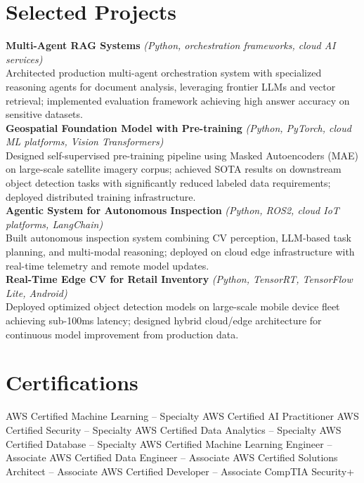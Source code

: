 \documentclass[11pt]{article}
\begin{document}
\section*{Selected Projects}
\textbf{Multi-Agent RAG Systems} \emph{(Python, orchestration frameworks, cloud AI services)}\\
Architected production multi-agent orchestration system with specialized reasoning agents for document analysis, leveraging frontier LLMs and vector retrieval; implemented evaluation framework achieving high answer accuracy on sensitive datasets.
\\[0.25em]
\textbf{Geospatial Foundation Model with Pre-training} \emph{(Python, PyTorch, cloud ML platforms, Vision Transformers)}\\
Designed self-supervised pre-training pipeline using Masked Autoencoders (MAE) on large-scale satellite imagery corpus; achieved SOTA results on downstream object detection tasks with significantly reduced labeled data requirements; deployed distributed training infrastructure.
\\[0.25em]
\textbf{Agentic System for Autonomous Inspection} \emph{(Python, ROS2, cloud IoT platforms, LangChain)}\\
Built autonomous inspection system combining CV perception, LLM-based task planning, and multi-modal reasoning; deployed on cloud edge infrastructure with real-time telemetry and remote model updates.
\\[0.25em]
\textbf{Real-Time Edge CV for Retail Inventory} \emph{(Python, TensorRT, TensorFlow Lite, Android)}\\
Deployed optimized object detection models on large-scale mobile device fleet achieving sub-100ms latency; designed hybrid cloud/edge architecture for continuous model improvement from production data.

\section*{Certifications}
AWS Certified Machine Learning -- Specialty \enspace\textbullet\enspace AWS Certified AI Practitioner \enspace\textbullet\enspace AWS Certified Security -- Specialty \enspace\textbullet\enspace AWS Certified Data Analytics -- Specialty \enspace\textbullet\enspace AWS Certified Database -- Specialty \enspace\textbullet\enspace AWS Certified Machine Learning Engineer -- Associate \enspace\textbullet\enspace AWS Certified Data Engineer -- Associate \enspace\textbullet\enspace AWS Certified Solutions Architect -- Associate \enspace\textbullet\enspace AWS Certified Developer -- Associate \enspace\textbullet\enspace CompTIA Security+

\end{document}
